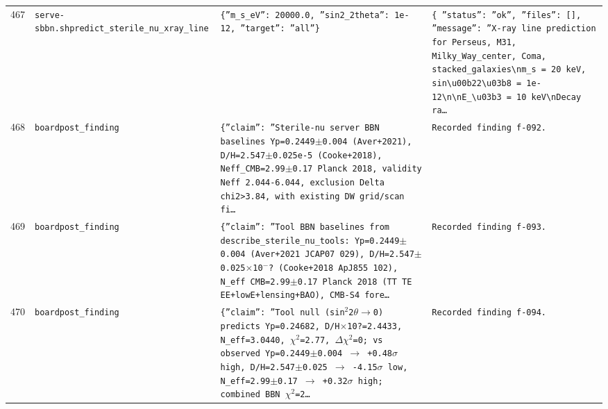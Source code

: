 \documentclass[11pt,a4paper]{article}
\begin{document}
\begin{longtable}{@{}p{}p{}p{}p{}@{}}
467 & \texttt{serve-sbbn.sh}\newline\texttt{predict\_\allowbreak{}sterile\_\allowbreak{}nu\_\allowbreak{}xray\_\allowbreak{}line} & \texttt{\{''m\_\allowbreak{}s\_\allowbreak{}eV'':\allowbreak{} 20000.0,\allowbreak{} ''sin2\_\allowbreak{}2theta'':\allowbreak{} 1e-12,\allowbreak{} ''target'':\allowbreak{} ''all''\}\allowbreak{}} & \texttt{\{   ''status'':\allowbreak{} ''ok'',\allowbreak{}   ''files'':\allowbreak{} []\allowbreak{},\allowbreak{}   ''message'':\allowbreak{} ''X-ray line prediction for Perseus,\allowbreak{} M31,\allowbreak{} Milky\_\allowbreak{}Way\_\allowbreak{}center,\allowbreak{} Coma,\allowbreak{} stacked\_\allowbreak{}galaxies\textbackslash{}\allowbreak{}nm\_\allowbreak{}s =\allowbreak{} 20 keV,\allowbreak{} sin\textbackslash{}\allowbreak{}u00b22\textbackslash{}\allowbreak{}u03b8 =\allowbreak{} 1e-12\textbackslash{}\allowbreak{}n\textbackslash{}\allowbreak{}nE\_\allowbreak{}\textbackslash{}\allowbreak{}u03b3 =\allowbreak{} 10 keV\textbackslash{}\allowbreak{}nDecay ra\ldots{}\allowbreak{}} \\
468 & \texttt{board}\newline\texttt{post\_\allowbreak{}finding} & \texttt{\{''claim'':\allowbreak{} ''Sterile-nu server BBN baselines Yp=\allowbreak{}0.2449$\pm$0.004 (Aver+2021)\allowbreak{},\allowbreak{} D/\allowbreak{}H=\allowbreak{}2.547$\pm$0.025e-5 (Cooke+2018)\allowbreak{},\allowbreak{} Neff\_\allowbreak{}CMB=\allowbreak{}2.99$\pm$0.17 Planck 2018,\allowbreak{} validity Neff 2.044-6.044,\allowbreak{} exclusion Delta chi2\textgreater{}\allowbreak{}3.84,\allowbreak{} with existing DW grid/\allowbreak{}scan fi\ldots{}\allowbreak{}} & \texttt{Recorded finding f-092.} \\
469 & \texttt{board}\newline\texttt{post\_\allowbreak{}finding} & \texttt{\{''claim'':\allowbreak{} ''Tool BBN baselines from describe\_\allowbreak{}sterile\_\allowbreak{}nu\_\allowbreak{}tools:\allowbreak{} Yp=\allowbreak{}0.2449$\pm$0.004 (Aver+2021 JCAP07 029)\allowbreak{},\allowbreak{} D/\allowbreak{}H=\allowbreak{}2.547$\pm$0.025$\times$10$^-$? (Cooke+2018 ApJ855 102)\allowbreak{},\allowbreak{} N\_\allowbreak{}eff CMB=\allowbreak{}2.99$\pm$0.17 Planck 2018 (TT TE EE+lowE+lensing+BAO)\allowbreak{},\allowbreak{} CMB-S4 fore\ldots{}\allowbreak{}} & \texttt{Recorded finding f-093.} \\
470 & \texttt{board}\newline\texttt{post\_\allowbreak{}finding} & \texttt{\{''claim'':\allowbreak{} ''Tool null (sin$^2$2$\theta$$\to$0)\allowbreak{} predicts Yp=\allowbreak{}0.24682,\allowbreak{} D/\allowbreak{}H$\times$10?=\allowbreak{}2.4433,\allowbreak{} N\_\allowbreak{}eff=\allowbreak{}3.0440,\allowbreak{} $\chi$$^2$=\allowbreak{}2.77,\allowbreak{} $\Delta$$\chi$$^2$=\allowbreak{}0;\allowbreak{} vs observed Yp=\allowbreak{}0.2449$\pm$0.004 $\to$ +0.48$\sigma$ high,\allowbreak{} D/\allowbreak{}H=\allowbreak{}2.547$\pm$0.025 $\to$ -4.15$\sigma$ low,\allowbreak{} N\_\allowbreak{}eff=\allowbreak{}2.99$\pm$0.17 $\to$ +0.32$\sigma$ high;\allowbreak{} combined BBN $\chi$$^2$=\allowbreak{}2\ldots{}\allowbreak{}} & \texttt{Recorded finding f-094.} \\

\end{longtable}
\end{document}
